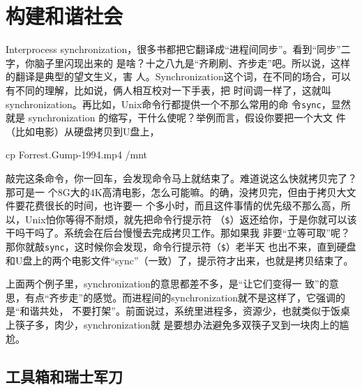 \documentclass{wx672ctexart}
\begin{document}
\section{构建和谐社会}
\label{sec:ipc}

Interprocess synchronization，很多书都把它翻译成“进程间同步”。看到“同步”二字，你脑子里闪现出来的
是啥？十之八九是“齐刷刷、齐步走”吧。所以说，这样的翻译是典型的望文生义，害
人。Synchronization这个词，在不同的场合，可以有不同的理解，比如说，俩人相互校对一下手表，把
时间调一样了，这就叫synchronization。再比如，Unix命令行都提供一个不那么常用的命
令\texttt{sync}，显然就是 synchronization 的缩写，干什么使呢？举例而言，假设你要把一个大文
件（比如电影）从硬盘拷贝到U盘上，
\begin{shcode}
  cp Forrest.Gump-1994.mp4 /mnt
\end{shcode}
敲完这条命令，你一回车，会发现命令马上就结束了。难道说这么快就拷贝完了？那可是一
个8G大的4K高清电影，怎么可能嘛。的确，没拷贝完，但由于拷贝大文件要花费很长的时间，也许要一
个多小时，而且这件事情的优先级不那么高，所以，Unix怕你等得不耐烦，就先把命令行提示符
（\texttt{\$}）返还给你，于是你就可以该干吗干吗了。系统会在后台慢慢去完成拷贝工作。那如果我
非要“立等可取”呢？那你就敲\texttt{sync}，这时候你会发现，命令行提示符（\texttt{\$}）老半天
也出不来，直到硬盘和U盘上的两个电影文件“sync”（一致）了，提示符才出来，也就是拷贝结束了。

上面两个例子里，synchronization的意思都差不多，是“让它们变得一
致”的意思，有点“齐步走”的感觉。而进程间的synchronization就不是这样了，它强调的是“和谐共处，
不要打架”。前面说过，系统里进程多，资源少，也就类似于饭桌上筷子多，肉少，synchronization就
是要想办法避免多双筷子叉到一块肉上的尴尬。

\subsection{工具箱和瑞士军刀}
\label{sec:toolbox}
\end{document}
